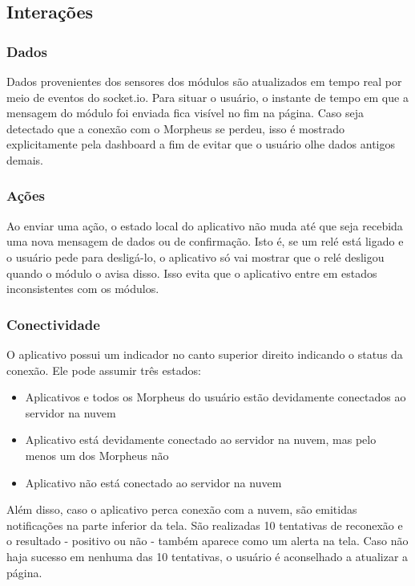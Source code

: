 \subsection{Interações}

\subsubsection{Dados}

Dados provenientes dos sensores dos módulos são atualizados em tempo real por meio de eventos do socket.io. Para situar o usuário, o instante de tempo em que a mensagem do módulo foi enviada fica visível no fim na página. Caso seja detectado que a conexão com o Morpheus se perdeu, isso é mostrado explicitamente pela dashboard a fim de evitar que o usuário olhe dados antigos demais.

\subsubsection{Ações}

Ao enviar uma ação, o estado local do aplicativo não muda até que seja recebida uma nova mensagem de dados ou de confirmação. Isto é, se um relé está ligado e o usuário pede para desligá-lo, o aplicativo só vai mostrar que o relé desligou quando o módulo o avisa disso. Isso evita que o aplicativo entre em estados inconsistentes com os módulos.

\subsubsection{Conectividade}

O aplicativo possui um indicador no canto superior direito indicando o status da conexão. Ele pode assumir três estados:

\begin{itemize}
\item Aplicativos e todos os Morpheus do usuário estão devidamente conectados ao servidor na nuvem
\item Aplicativo está devidamente conectado ao servidor na nuvem, mas pelo menos um dos Morpheus não
\item Aplicativo não está conectado ao servidor na nuvem
\end{itemize}

Além disso, caso o aplicativo perca conexão com a nuvem, são emitidas notificações na parte inferior da tela. São realizadas 10 tentativas de reconexão e o resultado - positivo ou não - também aparece como um alerta na tela. Caso não haja sucesso em nenhuma das 10 tentativas, o usuário é aconselhado a atualizar a página.


